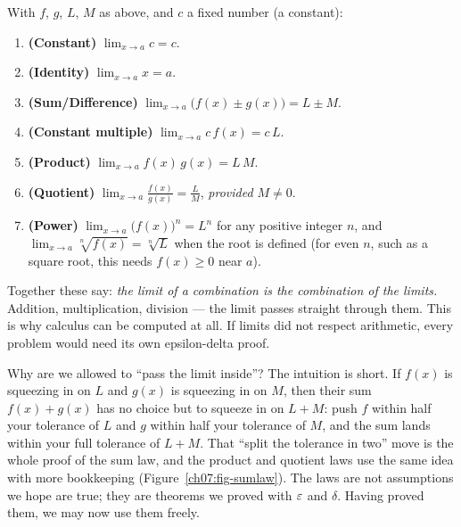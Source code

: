 \begin{theorem}
\label{ch07:thm-laws}
With $f$, $g$, $L$, $M$ as above, and $c$ a fixed number (a constant):
\begin{enumerate}
  \item \textbf{(Constant)} $\displaystyle\lim_{x\to a} c = c$.
  \item \textbf{(Identity)} $\displaystyle\lim_{x\to a} x = a$.
  \item \textbf{(Sum/Difference)} $\displaystyle\lim_{x\to a}\big(f(x)\pm g(x)\big) = L \pm M$.
  \item \textbf{(Constant multiple)} $\displaystyle\lim_{x\to a} c\,f(x) = c\,L$.
  \item \textbf{(Product)} $\displaystyle\lim_{x\to a} f(x)\,g(x) = L\,M$.
  \item \textbf{(Quotient)} $\displaystyle\lim_{x\to a} \frac{f(x)}{g(x)} = \frac{L}{M}$, \emph{provided $M \neq 0$}.
  \item \textbf{(Power)} $\displaystyle\lim_{x\to a} \big(f(x)\big)^{n} = L^{n}$ for any positive integer $n$, and $\displaystyle\lim_{x\to a}\sqrt[n]{f(x)} = \sqrt[n]{L}$ when the root is defined (for even $n$, such as a square root, this needs $f(x)\ge 0$ near $a$).
\end{enumerate}
\end{theorem}

Together these say: \emph{the limit of a
combination is the combination of the limits.} Addition, multiplication,
division --- the limit passes straight through them. This is why
calculus can be computed at all. If limits did not respect arithmetic, every
problem would need its own epsilon-delta proof.

\begin{whybox}
Why are we allowed to ``pass the limit inside''? The intuition is short. If
$f(x)$ is squeezing in on $L$ and $g(x)$ is squeezing in on $M$, then their
sum $f(x)+g(x)$ has no choice but to squeeze in on $L+M$: push $f$ within
half your tolerance of $L$ and $g$ within half your tolerance of $M$, and the
sum lands within your full tolerance of $L+M$. That ``split the tolerance in
two'' move is the whole proof of the sum law, and the product and quotient
laws use the same idea with more bookkeeping
(Figure~\ref{ch07:fig-sumlaw}). The laws are not
assumptions we hope are true; they are theorems we proved with $\varepsilon$ and $\delta$.
Having proved them, we may now use them freely.
\end{whybox}


